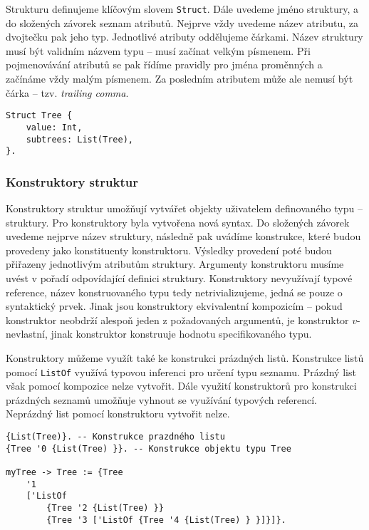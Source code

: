 Strukturu definujeme klíčovým slovem \lstinline{Struct}. Dále uvedeme jméno struktury, a do
složených závorek seznam atributů. Nejprve vždy uvedeme název atributu, za dvojtečku pak jeho typ.
Jednotlivé atributy oddělujeme čárkami. Název struktury musí být validním názvem typu -- musí
začínat velkým písmenem. Při pojmenovávání atributů se pak řídíme pravidly pro jména proměnných
a začínáme vždy malým písmenem. Za posledním atributem může ale nemusí být čárka -- tzv.
\textit{trailing comma}.

\begin{lstlisting}[caption={Příklad definice struktury}]
Struct Tree {
    value: Int,
    subtrees: List(Tree),
}.
\end{lstlisting}

\subsubsection{Konstruktory struktur}

Konstruktory struktur umožňují vytvářet objekty uživatelem definovaného typu -- struktury.
Pro konstruktory byla vytvořena nová syntax. Do složených závorek uvedeme nejprve název struktury,
následně pak uvádíme konstrukce, které budou provedeny jako konstituenty konstruktoru. Výsledky
provedení poté budou přiřazeny jednotlivým atributům struktury. Argumenty konstruktoru musíme uvést
v pořadí odpovídající definici struktury. Konstruktory nevyužívají typové reference, název
konstruovaného typu tedy netrivializujeme, jedná se pouze o syntaktický prvek. Jinak jsou
konstruktory ekvivalentní kompozicím -- pokud konstruktor neobdrží alespoň jeden z požadovaných
argumentů, je konstruktor $v$-nevlastní, jinak konstruktor konstruuje hodnotu specifikovaného typu.

Konstruktory můžeme využít také ke konstrukci prázdných listů. Konstrukce listů pomocí
\lstinline{ListOf} využívá typovou inferenci pro určení typu seznamu. Prázdný list však pomocí
kompozice nelze vytvořit. Dále využití konstruktorů pro konstrukci prázdných seznamů umožňuje
vyhnout se využívání typových referencí. Neprázdný list pomocí konstruktoru vytvořit nelze.

\begin{lstlisting}[caption={Příklad definice struktury},label=tree-creation]
{List(Tree)}. -- Konstrukce prazdného listu
{Tree '0 {List(Tree) }}. -- Konstrukce objektu typu Tree

myTree -> Tree := {Tree
    '1
    ['ListOf 
        {Tree '2 {List(Tree) }}
        {Tree '3 ['ListOf {Tree '4 {List(Tree) } }]}]}.
\end{lstlisting}

